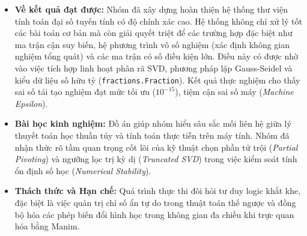 \documentclass[a4paper,12pt]{article}
\begin{document}
\begin{itemize}
    \item \textbf{Về kết quả đạt được:} Nhóm đã xây dựng hoàn thiện hệ thống thư viện tính toán đại số tuyến tính có độ chính xác cao. Hệ thống không chỉ xử lý tốt các bài toán cơ bản mà còn giải quyết triệt để các trường hợp đặc biệt như ma trận cận suy biến, hệ phương trình vô số nghiệm (xác định không gian nghiệm tổng quát) và các ma trận có số điều kiện lớn. Điều này có được nhờ vào việc tích hợp linh hoạt phân rã SVD, phương pháp lặp Gauss-Seidel và kiểu dữ liệu số hữu tỷ (\texttt{fractions.Fraction}). Kết quả thực nghiệm cho thấy sai số tái tạo nghiệm đạt mức tối ưu ($10^{-15}$), tiệm cận sai số máy (\textit{Machine Epsilon}).

    \item \textbf{Bài học kinh nghiệm:} Đồ án giúp nhóm hiểu sâu sắc mối liên hệ giữa lý thuyết toán học thuần túy và tính toán thực tiễn trên máy tính. Nhóm đã nhận thức rõ tầm quan trọng cốt lõi của kỹ thuật chọn phần tử trội (\textit{Partial Pivoting}) và ngưỡng lọc trị kỳ dị (\textit{Truncated SVD}) trong việc kiểm soát tính ổn định số học (\textit{Numerical Stability}).

    \item \textbf{Thách thức và Hạn chế:} Quá trình thực thi đòi hỏi tư duy logic khắt khe, đặc biệt là việc quản trị chỉ số ẩn tự do trong thuật toán thế ngược và đồng bộ hóa các phép biến đổi hình học trong không gian đa chiều khi trực quan hóa bằng Manim.
\end{itemize}
\end{document}
